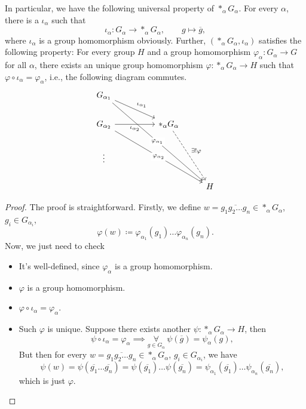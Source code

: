 \begin{remark}
	In particular, we have the following universal property of \(\ast_\alpha G_\alpha \). For every \(\alpha \), there is a \(\iota _\alpha \) such that
	\[
		\iota _\alpha \colon G_\alpha \to \ast_\alpha G_\alpha ,\qquad g\mapsto \overline{g},
	\]
	where \(\iota _\alpha \) is a group homomorphism obviously. Further, \((\ast_\alpha G_\alpha ,\iota _\alpha )\) satisfies the following property: For every
	group \(H\) and a group homomorphism \(\varphi _\alpha \colon G_\alpha \to G\) for all \(\alpha \), there exists an unique group homomorphism \(\varphi \colon \ast_\alpha G_\alpha \to H\)
	such that \(\varphi \circ \iota _\alpha = \varphi _\alpha \), i.e., the following diagram commutes.
	\[\begin{tikzcd}
			{G_{\alpha_1}} \\
			{G_{\alpha_2}} && {\ast_\alpha G_\alpha} \\
			\vdots \\
			&&& H
			\arrow["{\iota_{\alpha_1}}", from=1-1, to=2-3]
			\arrow["{\iota_{\alpha_2}}"', from=2-1, to=2-3]
			\arrow["{\exists ! \varphi}", dashed, from=2-3, to=4-4]
			\arrow["{\varphi_{\alpha_1}}"{description}, from=1-1, to=4-4]
			\arrow["{\varphi_{\alpha_2}}"{description}, from=2-1, to=4-4]
		\end{tikzcd}\]
	\begin{proof}
		The proof is straightforward. Firstly, we define \(w = \overline{g_1 g_2\ldots g_n}\in \ast_\alpha G_\alpha\), \(g_{i} \in G_{\alpha_{i} } \),
		\[
			\varphi (w)\coloneqq \varphi _{\alpha _1}(g_1)\ldots \varphi _{\alpha _{n} }(g_{n} ).
		\]
		Now, we just need to check
		\begin{itemize}
			\item It's well-defined, since \(\varphi_\alpha \) is a group homomorphism.
			\item \(\varphi \) is a group homomorphism.
			\item \(\varphi \circ \iota _\alpha =\varphi _\alpha \).
			\item Such \(\varphi \) is unique. Suppose there exists another \(\psi \colon \ast_\alpha G_\alpha \to H\), then
			      \[
				      \psi \circ \iota _\alpha = \varphi _\alpha \implies \underset{g\in G_\alpha }{\forall }\ \psi (\overline{g} )= \psi _\alpha (g),
			      \]
			      But then for every \(w = \overline{g_1 g_2\ldots g_n}\in \ast_\alpha G_\alpha\), \(g_{i} \in G_{\alpha_{i} } \), we have
			      \[
				      \psi (w) = \psi (\overline{g_1}\ldots \overline{g_n}) = \psi (\overline{g_1}) \ldots \psi (\overline{g_n})  = \psi _{\alpha _1}(\overline{g_1}) \ldots \psi _{\alpha_n}(\overline{g_n}),
			      \]
			      which is just \(\varphi \).
		\end{itemize}
	\end{proof}
\end{remark}
